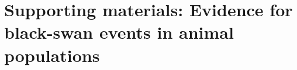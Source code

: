 \chapter[Supporting materials]{Supporting materials: Evidence for black-swan
events in animal populations}
